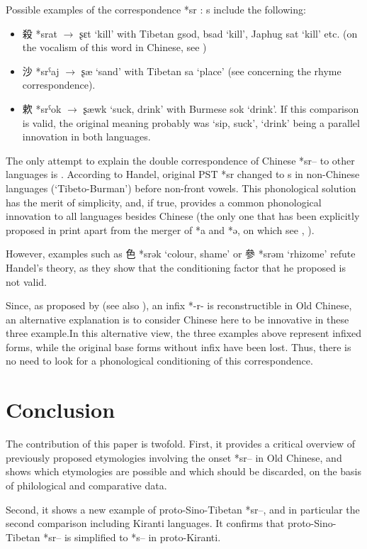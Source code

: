 \documentclass[oldfontcommands,oneside,a4paper,11pt]{article}
\newcommand{\ipa}[1]{{\phon #1}} %
\newcommand{\zh}[1]{{\cn #1}}
\newcommand{\archaic}[4]{\zh{#1} *\ipa{#2} $\rightarrow$ \ipa{#3} `#4'}
\begin{document}
Possible examples of the correspondence *\ipa{sr} : \ipa{s} include the following:

\begin{itemize}

\item  \archaic{殺}{srat}{ʂɛt}{kill} with Tibetan \ipa{gsod, bsad} `kill', Japhug \ipa{sat} `kill' etc. (on the vocalism of this word in Chinese, see \citealt[214]{bs14oc})

\item \archaic{沙}{srˁaj}{ʂæ}{sand}  with Tibetan \ipa{sa} `place' (see \citealt{hill14jrn} concerning the rhyme correspondence).

\item  \archaic{欶}{srˁok}{ʂæwk}{suck, drink} with Burmese \ipa{sok} `drink'. If this comparison is valid, the original meaning probably was `sip, suck', `drink' being a parallel innovation in both languages.

\end{itemize}
The only attempt to explain the double correspondence of Chinese *\ipa{sr--} to other languages is \citet[25]{handel02r}. According to Handel, original PST *\ipa{sr} changed to s in non-Chinese languages (`Tibeto-Burman') before non-front vowels. This phonological solution has the merit of simplicity, and, if true, provides a common phonological innovation to all languages besides Chinese (the only one that has been explicitly proposed in print apart from the merger of *\ipa{a} and *\ipa{ə}, on which see \citealt{gong95st}, \citealt{handel08st}).

However, examples such as \zh{色} *\ipa{srək} `colour, shame' or \zh{參} *\ipa{srəm} `rhizome' refute Handel's theory, as they show that the conditioning factor that he proposed is not valid.

Since, as proposed by \citet{sagart99roc}(see also \citealt[57-8]{bs14oc}), an infix *\ipa{-r-} is reconstructible in Old Chinese, an alternative explanation is to consider Chinese here to be innovative in these three example.In this alternative view, the three examples above represent infixed forms, while the original base forms without infix have been lost. Thus, there is no need to look for a phonological conditioning of this correspondence.



\section{Conclusion}

The contribution of this paper is twofold. First, it provides a critical overview of previously proposed etymologies involving the onset *\ipa{sr--} in Old Chinese, and shows which etymologies are possible and which should be discarded, on the basis of philological and comparative data.

Second, it shows a new example of proto-Sino-Tibetan *\ipa{sr--}, and in particular the second comparison including Kiranti languages. It confirms that proto-Sino-Tibetan *\ipa{sr--} is simplified to *\ipa{s--} in proto-Kiranti.




\end{document}
